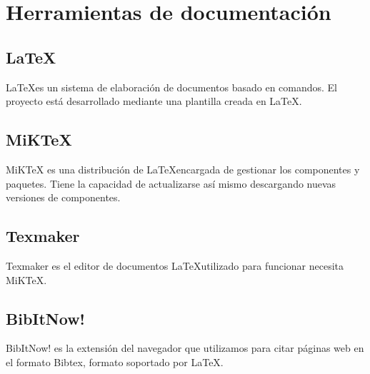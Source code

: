 \section{Herramientas de documentación}
\subsection{\LaTeX}
\LaTeX es un sistema de elaboración de documentos basado en comandos. El proyecto está desarrollado mediante una plantilla creada en \LaTeX.

\subsection{MiKTeX}
MiKTeX es una distribución de \LaTeX encargada de gestionar los componentes y paquetes. Tiene la capacidad de actualizarse así mismo descargando nuevas versiones de componentes.

\subsection{Texmaker}
Texmaker es el editor de documentos \LaTeX utilizado para funcionar necesita MiKTeX.

\subsection{BibItNow!}
BibItNow! es la extensión del navegador que utilizamos para citar páginas web en el formato Bibtex, formato soportado por \LaTeX.
